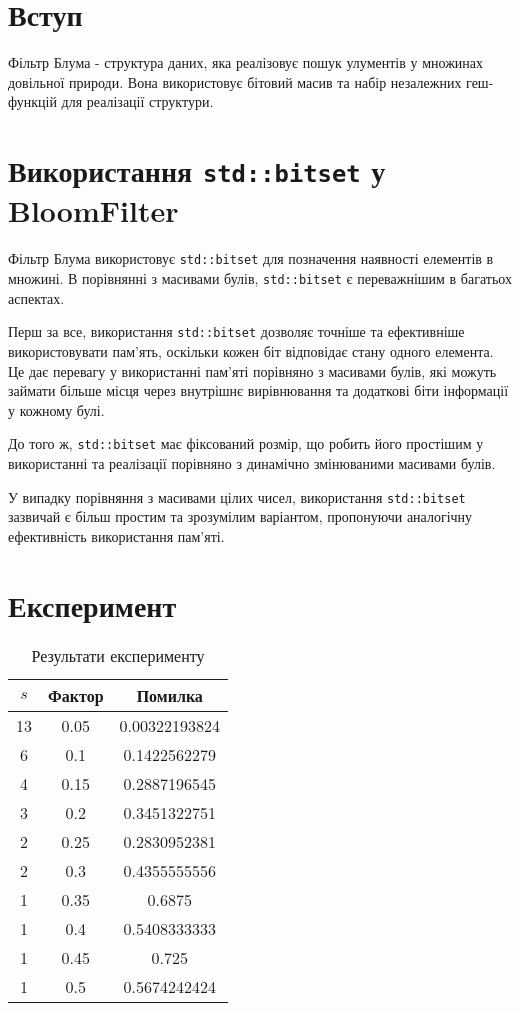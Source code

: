 \documentclass[12pt]{article}
\begin{document}
\section{Вступ}
\quad Фільтр Блума - структура даних, яка реалізовує пошук улументів у множинах довільної природи. Вона використовує бітовий масив та набір незалежних геш-функцій для реалізації структури.

\section{Використання \texttt{std::bitset} у BloomFilter}
\quad Фільтр Блума використовує \texttt{std::bitset} для позначення наявності елементів в множині. В порівнянні з масивами булів, \texttt{std::bitset} є переважнішим в багатьох аспектах.

\quad Перш за все, використання \texttt{std::bitset} дозволяє точніше та ефективніше використовувати пам'ять, оскільки кожен біт відповідає стану одного елемента. Це дає перевагу у використанні пам'яті порівняно з масивами булів, які можуть займати більше місця через внутрішнє вирівнювання та додаткові біти інформації у кожному булі.

\quad До того ж, \texttt{std::bitset} має фіксований розмір, що робить його простішим у використанні та реалізації порівняно з динамічно змінюваними масивами булів.

\quad У випадку порівняння з масивами цілих чисел, використання \texttt{std::bitset} зазвичай є більш простим та зрозумілим варіантом, пропонуючи аналогічну ефективність використання пам'яті.

\newpage
\section{Експеримент}

\begin{table}[htbp]
\centering
\begin{tabular}{ccc}
\toprule
$s$ & \textbf{Фактор} & \textbf{Помилка} \\
\midrule
13 & 0.05 & 0.00322193824 \\
6 & 0.1 & 0.1422562279 \\
4 & 0.15 & 0.2887196545 \\
3 & 0.2 & 0.3451322751 \\
2 & 0.25 & 0.2830952381 \\
2 & 0.3 & 0.4355555556 \\
1 & 0.35 & 0.6875 \\
1 & 0.4 & 0.5408333333 \\
1 & 0.45 & 0.725 \\
1 & 0.5 & 0.5674242424 \\
\bottomrule
\end{tabular}
\caption{Результати експерименту}
\label{tab:experiment}
\end{table}
\end{document}
